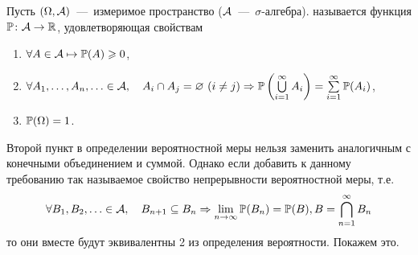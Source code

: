 \documentclass[../TV&MS.tex]{subfiles}
\begin{document}
\begin{Def}
    Пусть $(\Omega, \mathcal{A})$~---~измеримое пространство 
    ($\mathcal{A}$~---~$\sigma$-алгебра).
	 называется функция $\mathbb{P} \colon \mathcal{A}\rightarrow \mathbb{R}$, 
	удовлетворяющая свойствам
\begin{enumerate}
	\item $\forall A \in \mathcal{A} \mapsto \mathbb{P} (A) \geqslant 0$,
    \item $\forall A_1, \ldots, A_n, \ldots \in \mathcal{A}, \quad A_i \cap A_j  = \varnothing\  
    (i \not= j)  \Rightarrow \mathbb{P} \left(\bigcup\limits_{i=1}^{\infty} A_i\right) = 
    \sum\limits_{i = 1}^{\infty}\mathbb{P}(A_i)$,
	\item $\mathbb{P} (\Omega) = 1$.
\end{enumerate}
\end{Def}

Второй пункт в определении вероятностной меры нельзя заменить аналогичным с конечными 
объединением и суммой. Однако если добавить к данному требованию так называемое свойство 
непрерывности вероятностной меры, т.е.
$$
	\forall B_1, B_2, \ldots \in \mathcal{A}, \quad B_{n+1} \subseteq B_n 
	\Rightarrow \lim_{n \to \infty} \mathbb{P}(B_n) = \mathbb{P}(B), B = \bigcap_{n=1}^\infty B_n
$$
то они вместе будут эквивалентны 2 из определения вероятности. Покажем это.
\end{document}
